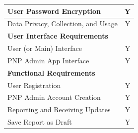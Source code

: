 \begin{table}[]
\begin{tabular}{|lc|}
\multicolumn{1}{|l|}{User Password Encryption}                                                                                                                      & Y                                                                     \\ \hline
\multicolumn{1}{|l|}{Data Privacy, Collection, and Usage}                                                                                                           & Y                                                                     \\ \hline
\multicolumn{2}{|l|}{\textbf{User Interface Requirements}}                                                                                                                                                                                  \\ \hline
\multicolumn{1}{|l|}{User (or Main) Interface}                                                                                                                      & Y                                                                     \\ \hline
\multicolumn{1}{|l|}{PNP Admin App Interface}                                                                                                                       & Y                                                                     \\ \hline
\multicolumn{2}{|l|}{\textbf{Functional Requirements}}                                                                                                                                                                                      \\ \hline
\multicolumn{1}{|l|}{User Registration}                                                                                                                             & Y                                                                     \\ \hline
\multicolumn{1}{|l|}{PNP Admin Account Creation}                                                                                                                    & Y                                                                     \\ \hline
\multicolumn{1}{|l|}{Reporting and Receiving Updates}                                                                                                               & Y                                                                     \\ \hline
\multicolumn{1}{|l|}{Save Report as Draft}                                                                                                               & Y                                                                                                \\ \hline


\end{tabular}
\end{table}
